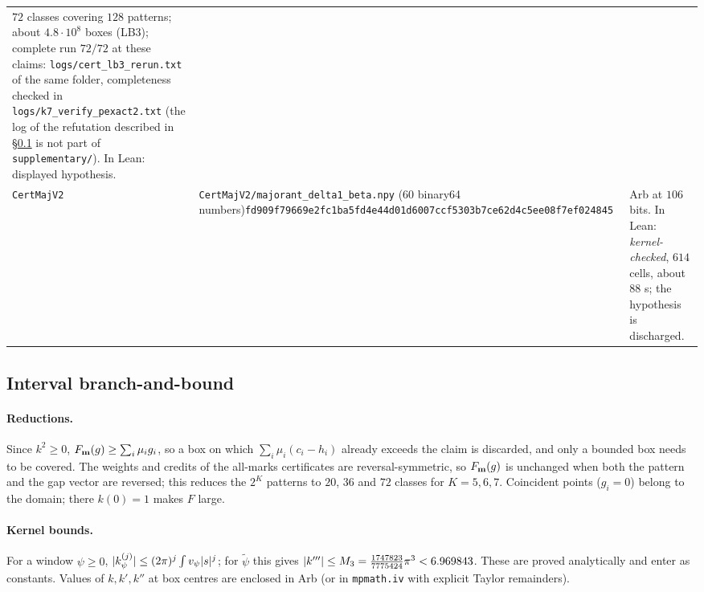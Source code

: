 \begin{table}[ht]
\begin{tabular}{@{}p{1.3cm}>{\raggedright\arraybackslash}p{7.9cm}>{\raggedright\arraybackslash}p{5.8cm}@{}}
$72$ classes covering $128$ patterns; about $4.8\cdot10^8$ boxes (LB3); complete run $72/72$ at these claims:
\texttt{logs/cert\_lb3\_rerun.txt} of the same folder, completeness checked in \texttt{logs/k7\_verify\_pexact2.txt}
(the log of the refutation described in \S\ref{ssec:bnb} is not part of \texttt{supplementary/}). In Lean: displayed hypothesis.\\[4pt]
\texttt{CertMajV2} & \texttt{CertMajV2/\allowbreak majorant\_delta1\_beta.npy} ($60$ binary64 numbers)\newline \texttt{fd909f79669e2fc1ba5fd4e44d01d600}\newline\texttt{7ccf5303b7ce62d4c5ee08f7ef024845} &
Arb at $106$ bits. In Lean: \emph{kernel-checked}, $614$ cells, about $88$ s; the hypothesis is discharged.\\
\bottomrule
\end{tabular}
\end{table}

\subsection{Interval branch-and-bound}\label{ssec:bnb}
\paragraph{Reductions.} Since $k^2\ge0$, $F_{\mathbf m}(g)\ge\sum_i\mu_ig_i$, so a box on which $\sum_i\mu_i(c_i-h_i)$ already exceeds the claim is
discarded, and only a bounded box needs to be covered. The weights and credits of the all-marks certificates are reversal-symmetric, so
$F_{\mathbf m}(g)$ is unchanged when both the pattern and the gap vector are reversed; this reduces the $2^K$ patterns to $20$, $36$ and $72$ classes for
$K=5,6,7$. Coincident points ($g_i=0$) belong to the domain; there $k(0)=1$ makes $F$ large.

\paragraph{Kernel bounds.} For a window $\psi\ge0$, $\lvert k_\psi^{(j)}\rvert\le(2\pi)^j\int v_\psi\lvert s\rvert^j$; for $\tilde\psi$ this gives
$\lvert k'''\rvert\le M_3=\frac{1747823}{7775424}\pi^3<6.969843$. These are proved analytically and enter as constants. Values of $k,k',k''$ at box centres are enclosed in Arb (or in
\texttt{mpmath.iv} with explicit Taylor remainders).

